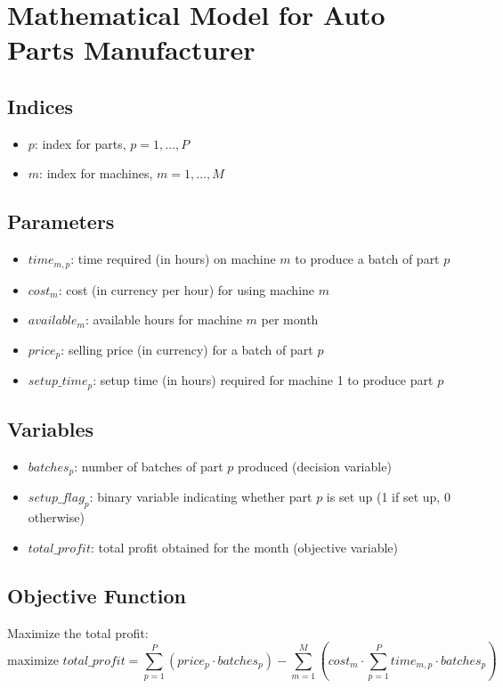 \documentclass{article}
\begin{document}
\section*{Mathematical Model for Auto Parts Manufacturer}

\subsection*{Indices}
\begin{itemize}
    \item \( p \): index for parts, \( p = 1, \ldots, P \)
    \item \( m \): index for machines, \( m = 1, \ldots, M \)
\end{itemize}

\subsection*{Parameters}
\begin{itemize}
    \item \( time_{m,p} \): time required (in hours) on machine \( m \) to produce a batch of part \( p \)
    \item \( cost_{m} \): cost (in currency per hour) for using machine \( m \)
    \item \( available_{m} \): available hours for machine \( m \) per month
    \item \( price_{p} \): selling price (in currency) for a batch of part \( p \)
    \item \( setup\_time_{p} \): setup time (in hours) required for machine 1 to produce part \( p \)
\end{itemize}

\subsection*{Variables}
\begin{itemize}
    \item \( batches_{p} \): number of batches of part \( p \) produced (decision variable)
    \item \( setup\_flag_{p} \): binary variable indicating whether part \( p \) is set up (1 if set up, 0 otherwise)
    \item \( total\_profit \): total profit obtained for the month (objective variable)
\end{itemize}

\subsection*{Objective Function}
Maximize the total profit:
\[
\text{maximize } total\_profit = \sum_{p=1}^{P} (price_{p} \cdot batches_{p}) - \sum_{m=1}^{M} \left( cost_{m} \cdot \sum_{p=1}^{P} time_{m,p} \cdot batches_{p} \right)
\]
\end{document}
